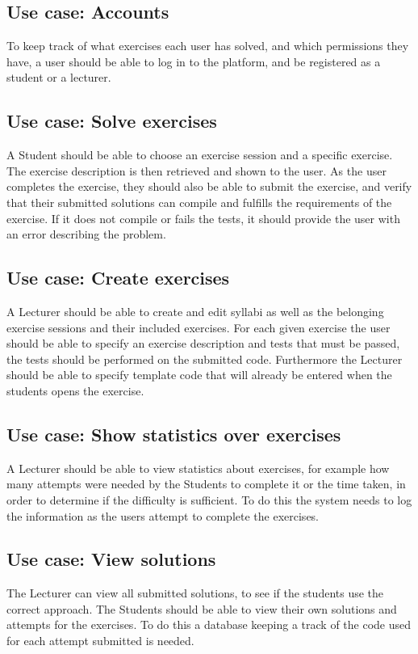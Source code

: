 \subsection*{Use case: Accounts}
To keep track of what exercises each user has solved, and which permissions they have, a user should be able to log in to the platform, and be registered as a student or a lecturer.

\subsection{Use case: Solve exercises} \label{sec:hej}
A Student should be able to choose an exercise session and a specific exercise. The exercise description is then retrieved and shown to the user.
As the user completes the exercise, they should also be able to submit the exercise, and verify that their submitted solutions can compile and fulfills the requirements of the exercise. If it does not compile or fails the tests, it should provide the user with an error describing the problem. 

\subsection*{Use case: Create exercises}
A Lecturer should be able to create and edit syllabi as well as the belonging exercise sessions and their included exercises. 
For each given exercise the user should be able to specify an exercise description and tests that must be passed, the tests should be performed on the submitted code. Furthermore the Lecturer should be able to specify template code that will already be entered when the students opens the exercise.

\subsection*{Use case: Show statistics over exercises}
A Lecturer should be able to view statistics about exercises, for example how many attempts were needed by the Students to complete it or the time taken, in order to determine if the difficulty is sufficient. To do this the system needs to log the information as the users attempt to complete the exercises.

\subsection*{Use case: View solutions}
The Lecturer can view all submitted solutions, to see if the students use the correct approach.
The Students should be able to view their own solutions and attempts for the exercises.
To do this a database keeping a track of the code used for each attempt submitted is needed. 


